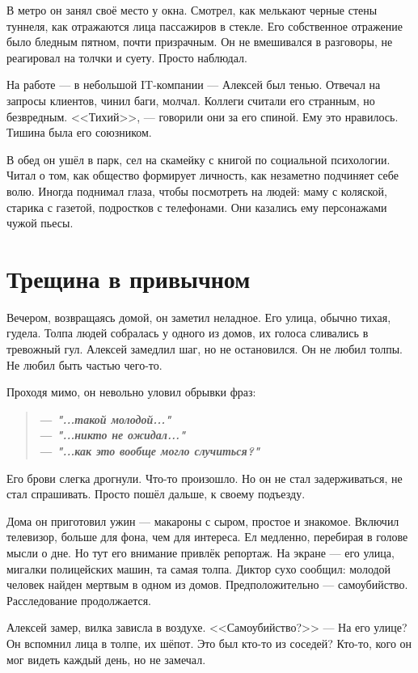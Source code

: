 \documentclass[12pt,a4paper]{book}
\newenvironment{dialogue}{\begin{quote}\itshape}{\end{quote}}
\begin{document}
В метро он занял своё место у окна. Смотрел, как мелькают черные стены туннеля, как отражаются лица пассажиров в стекле. Его собственное отражение было бледным пятном, почти призрачным. Он не вмешивался в разговоры, не реагировал на толчки и суету. Просто наблюдал.

На работе --- в небольшой IT-компании --- Алексей был тенью. Отвечал на запросы клиентов, чинил баги, молчал. Коллеги считали его странным, но безвредным. <<Тихий>>, --- говорили они за его спиной. Ему это нравилось. Тишина была его союзником.

В обед он ушёл в парк, сел на скамейку с книгой по социальной психологии. Читал о том, как общество формирует личность, как незаметно подчиняет себе волю. Иногда поднимал глаза, чтобы посмотреть на людей: маму с коляской, старика с газетой, подростков с телефонами. Они казались ему персонажами чужой пьесы.

\section{Трещина в привычном}

Вечером, возвращаясь домой, он заметил неладное. Его улица, обычно тихая, гудела. Толпа людей собралась у одного из домов, их голоса сливались в тревожный гул. Алексей замедлил шаг, но не остановился. Он не любил толпы. Не любил быть частью чего-то.

Проходя мимо, он невольно уловил обрывки фраз:
\begin{dialogue}
\textbf{--- "...такой молодой..."}\\[0.5em]
\textbf{--- "...никто не ожидал..."}\\[0.5em]
\textbf{--- "...как это вообще могло случиться?"}
\end{dialogue}

Его брови слегка дрогнули. Что-то произошло. Но он не стал задерживаться, не стал спрашивать. Просто пошёл дальше, к своему подъезду.

Дома он приготовил ужин --- макароны с сыром, простое и знакомое. Включил телевизор, больше для фона, чем для интереса. Ел медленно, перебирая в голове мысли о дне. Но тут его внимание привлёк репортаж. На экране --- его улица, мигалки полицейских машин, та самая толпа. Диктор сухо сообщил: молодой человек найден мертвым в одном из домов. Предположительно --- самоубийство. Расследование продолжается.

Алексей замер, вилка зависла в воздухе. <<Самоубийство?>> --- На его улице? Он вспомнил лица в толпе, их шёпот. Это был кто-то из соседей? Кто-то, кого он мог видеть каждый день, но не замечал.
\end{document}
